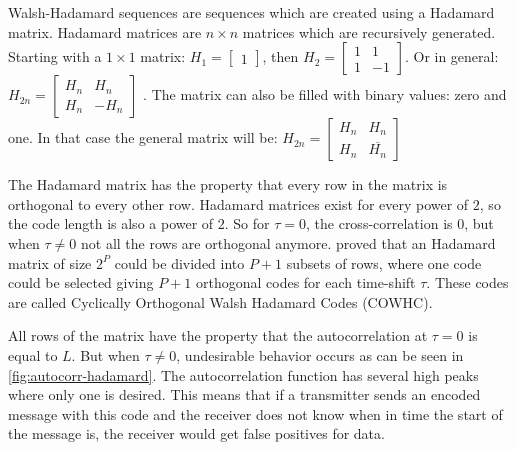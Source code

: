 		Walsh-Hadamard sequences are sequences which are created using a Hadamard matrix.
		Hadamard matrices are $n \times n$ matrices which are recursively generated.
		Starting with a $1 \times 1$ matrix: 
		$H_{1} = \begin{bmatrix} 1 \end{bmatrix}$, then 
		$H_{2} = \begin{bmatrix} 1 & 1 \\ 1 & -1 \end{bmatrix}$.
		Or in general: $H_{2n} = \begin{bmatrix} H_n & H_n \\ H_n & -H_n \end{bmatrix}$ \cite{714616}.
		The matrix can also be filled with binary values: zero and one. In that case the general matrix will be: 
		$H_{2n} = \begin{bmatrix} H_n & H_n \\ H_n & \overline{H_n} \end{bmatrix}$

		The Hadamard matrix has the property that every row in the matrix is orthogonal to every other row.
		Hadamard matrices exist for every power of $2$, so the code length is also a power of $2$.
		So for $\tau = 0$, the cross-correlation is $0$, but when $\tau \neq 0$ not all the rows are orthogonal anymore.
		\cite{1182447} proved that an Hadamard matrix of size $2^P$ could be divided into $P + 1$ subsets of rows, where one code could be selected giving $P + 1$ orthogonal codes for each time-shift $\tau$.
		These codes are called Cyclically Orthogonal Walsh Hadamard Codes (COWHC).

		All rows of the matrix have the property that the autocorrelation at $\tau = 0$ is equal to $L$.
		But when $\tau \neq 0$, undesirable behavior occurs as can be seen in \autoref{fig:autocorr-hadamard}.
		The autocorrelation function has several high peaks where only one is desired.
		This means that if a transmitter sends an encoded message with this code and the receiver does not know when in time the start of the message is, the receiver would get false positives for data.

